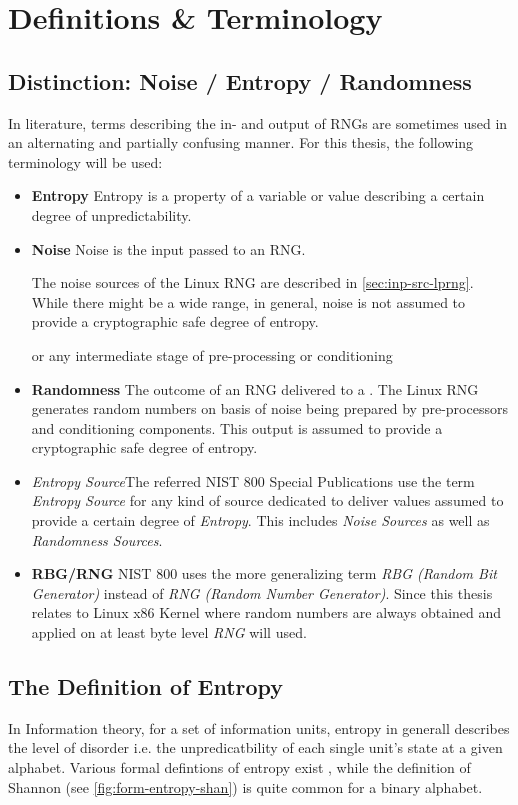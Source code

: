 \section{Definitions \& Terminology}

\subsection{Distinction: Noise / Entropy / Randomness}
In literature, terms describing the in- and output of RNGs are sometimes used in an alternating and partially confusing manner. For this thesis, the following terminology will be used:

\begin{itemize}
	\item \textbf{Entropy} Entropy is a property of a variable or value describing a certain degree of unpredictability. 
	\item \textbf{Noise} Noise is the input passed to an RNG. 
	
	
	The noise sources of the Linux RNG are described in \ref{sec:inp-src-lprng}. While there might be a wide range, in general, noise is not assumed to provide a cryptographic safe degree of entropy. 
	
	or any intermediate stage of pre-processing or conditioning
	
	\item \textbf{Randomness} The outcome of an RNG delivered to a . The Linux RNG generates random numbers on basis of noise being prepared by pre-processors and conditioning components. This output is assumed to provide a cryptographic safe degree of entropy.  
	\item \textit{Entropy Source}The referred NIST 800 Special Publications use the term \textit{Entropy Source} for any kind of source dedicated to deliver values assumed to provide a certain degree of \textit{Entropy}. This includes \textit{Noise Sources} as well as \textit{Randomness Sources}.	
	\item \textbf{RBG/RNG} NIST 800 uses the more generalizing term \textit{RBG (Random Bit Generator)} instead of \textit{RNG (Random Number Generator)}. Since this thesis relates to Linux x86 Kernel where random numbers are always obtained and applied on at least byte level \textit{RNG} will used.
\end{itemize}

\subsection{The Definition of Entropy}
In Information theory, for a set of information units, entropy in generall describes the level of disorder i.e. the unpredicatbility of each single unit's state at a given alphabet. Various formal defintions of entropy exist \cite{hagerty2012entropy}, while the definition of Shannon (see \ref{fig:form-entropy-shan}) is quite common for a binary alphabet. 

